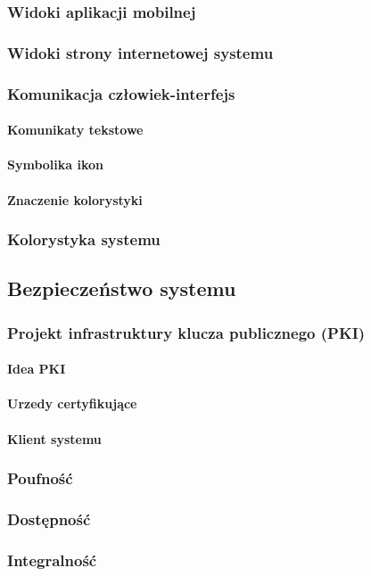 	\subsubsection{Widoki aplikacji mobilnej}
	
	\subsubsection{Widoki strony internetowej systemu}
	
	\subsubsection{Komunikacja człowiek-interfejs}
	
		\paragraph{Komunikaty tekstowe}
		\paragraph{Symbolika ikon}
		\paragraph{Znaczenie kolorystyki}
		
	\subsubsection{Kolorystyka systemu}
	
\subsection{Bezpieczeństwo systemu}
	\subsubsection{Projekt infrastruktury klucza publicznego (PKI)}
		\paragraph{Idea PKI}
		\paragraph{Urzedy certyfikujące}
		\paragraph{Klient systemu}
	\subsubsection{Poufność}
	\subsubsection{Dostępność}
	\subsubsection{Integralność}